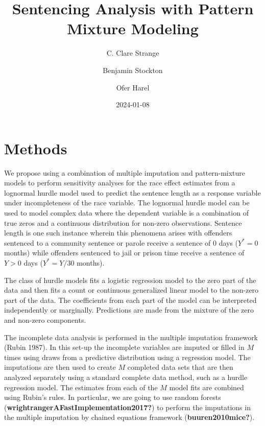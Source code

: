 \documentclass[
  letterpaper,
  DIV=11,
  numbers=noendperiod]{scrartcl}
\title{Sentencing Analysis with Pattern Mixture Modeling}
\author{C. Clare Strange \and Benjamin Stockton \and Ofer Harel}
\date{2024-01-08}
\begin{document}
\maketitle
\ifdefined\Shaded\renewenvironment{Shaded}{\begin{tcolorbox}[interior hidden, sharp corners, borderline west={3pt}{0pt}{shadecolor}, frame hidden, boxrule=0pt, enhanced, breakable]}{\end{tcolorbox}}\fi

\hypertarget{methods}{%
\section{Methods}\label{methods}}

We propose using a combination of multiple imputation and
pattern-mixture models to perform sensitivity analyses for the race
effect estimates from a lognormal hurdle model used to predict the
sentence length as a response variable under incompleteness of the race
variable. The lognormal hurdle model can be used to model complex data
where the dependent variable is a combination of true zeros and a
continuous distribution for non-zero observations. Sentence length is
one such instance wherein this phenomena arises with offenders sentenced
to a community sentence or parole receive a sentence of 0 days
(\(Y^* = 0\) months) while offenders sentenced to jail or prison time
receive a sentence of \(Y > 0\) days (\(Y^* = Y/30\) months).

The class of hurdle models fits a logistic regression model to the zero
part of the data and then fits a count or continuous generalized linear
model to the non-zero part of the data. The coefficients from each part
of the model can be interpreted independently or marginally. Predictions
are made from the mixture of the zero and non-zero components.

The incomplete data analysis is performed in the multiple imputation
framework (Rubin 1987). In this set-up the incomplete variables are
imputed or filled in \(M\) times using draws from a predictive
distribution using a regression model. The imputations are then used to
create \(M\) completed data sets that are then analyzed separately using
a standard complete data method, such as a hurdle regression model. The
estimates from each of the \(M\) model fits are combined using Rubin's
rules. In particular, we are going to use random forests
(\textbf{wrightrangerAFastImplementation2017?}) to perform the
imputations in the multiple imputation by chained equations framework
(\textbf{buuren2010mice?}).
\end{document}
